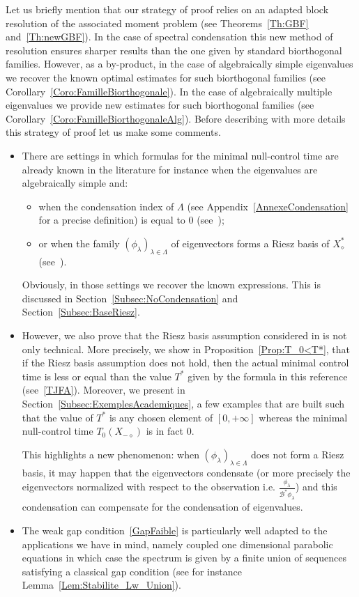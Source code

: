 \documentclass[10pt]{amsart}
\theoremstyle{definition}\newtheorem{defi}[theo]{Definition}\newtheorem{rema}[theo]{Remark}\newtheorem{exam}[theo]{Example}\newtheorem{exem}[theo]{Example}\newtheorem{nota}[theo]{Notation}
\newcommand\Bs{\mathcal{B}^*}
\newcommand{\Xalphas}{X_\diamond^*}
\newcommand{\Xmalpha}{X_{-\diamond}}
\begin{document}
Let us briefly mention that our strategy of proof relies on an adapted block resolution of the associated moment problem (see Theorems~\ref{Th:GBF} and~\ref{Th:newGBF}). In the case of spectral condensation this new method of resolution ensures sharper results than the one given by standard biorthogonal families. However, as a by-product, in the case of algebraically simple eigenvalues we recover the known optimal estimates for such biorthogonal families (see Corollary~\ref{Coro:FamilleBiorthogonale}). In the case of algebraically multiple eigenvalues we provide new estimates for such biorthogonal families (see Corollary~\ref{Coro:FamilleBiorthogonaleAlg}). Before describing with more details this strategy of proof let us make some comments.
\begin{itemize}
\item There are settings in which formulas for the minimal null-control time are already known in the literature for instance when the eigenvalues are algebraically simple and:
\begin{itemize}
\item when the condensation index of $\Lambda$ (see Appendix~\ref{AnnexeCondensation} for a precise definition) is equal to $0$ (see~\cite[Remark~1.15]{AKBGBM_2018});
\item or when the family $(\phi_\lambda)_{\lambda\in \Lambda}$ of eigenvectors forms a Riesz basis of $\Xalphas$ (see~\cite{AmmarKhodjaBenabdallahGonzalez-BurgosdeTeresa:2014}).
\end{itemize}
Obviously, in those settings we recover the known expressions. This is discussed in Section~\ref{Subsec:NoCondensation} and Section~\ref{Subsec:BaseRiesz}.
\item However, we also prove that the Riesz basis assumption considered in\linebreak \cite{AmmarKhodjaBenabdallahGonzalez-BurgosdeTeresa:2014} is not only technical. More precisely, we show in Proposition~\ref{Prop:T_0<T*}, that if the Riesz basis assumption does not hold, then the actual minimal control time is less or equal than the value $T^*$ given by the formula in this reference (see~\eqref{TJFA}). Moreover, we present in Section~\ref{Subsec:ExemplesAcademiques}, a few examples that are built such that the value of $T^*$ is any chosen element of $[0, +\infty]$ whereas the minimal null-control time $T_0(\Xmalpha)$ is in fact $0$.

This highlights a new phenomenon: when $(\phi_\lambda)_{\lambda\in \Lambda}$ does not form a Riesz basis, it may happen that the eigenvectors condensate (or more precisely the eigenvectors normalized with respect to the observation i.e. $\frac{\phi_\lambda}{\Bs \phi_\lambda}$) and this condensation can compensate for the condensation of eigenvalues.
\item The weak gap condition~\eqref{GapFaible} is particularly well adapted to the applications we have in mind, namely coupled one dimensional parabolic equations in which case the spectrum is given by a finite union of sequences satisfying a classical gap condition (see for instance Lemma~\ref{Lem:Stabilite_Lw_Union}).


\end{itemize}
\end{document}
